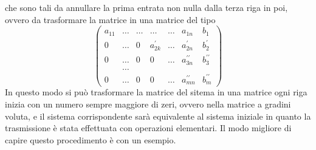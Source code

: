\documentclass{book}
\theoremstyle{definition}
\theoremstyle{plain}
\begin{document}
che sono tali da annullare la prima entrata non nulla dalla terza riga in
poi, ovvero da trasformare la matrice in una matrice del tipo
\begin{equation}
  \label{eq:gauss-jorda6}
  \begin{pmatrix}
    a_{11} & \dots & \dots & \dots & \dots & a_{1n} & b_1\\
    0 & \dots & 0 & a_{2k}^\prime & \dots & a_{2n}^\prime & b_2^\prime\\
    0 & \dots & 0 & 0 & \dots & a_{3n}^{\prime\prime} & b_3^{\prime\prime} \\
           &\dots\\
    0 & \dots & 0 & 0 & \dots & a_{mn}^{\prime\prime} & b_{m}^{\prime\prime}
  \end{pmatrix}
\end{equation}
In questo modo si può trasformare la matrice del sitema in una matrice
ogni riga inizia con un numero sempre maggiore di zeri, ovvero nella
matrice a gradini voluta, e il sistema corrispondente sarà equivalente al
sistema iniziale in quanto la trasmissione è stata effettuata con
operazioni elementari. Il modo migliore di capire questo procedimento è
con un esempio.
\end{document}
